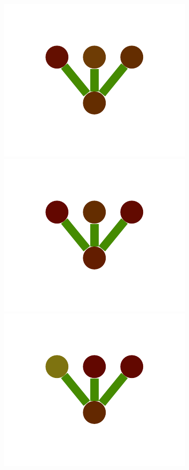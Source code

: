 \documentclass[a4paper,10pt]{article}
\begin{document}
\begin{figure}
{    \includegraphics[scale=.2]{./figures/6-1-single-color-flower-data-3.pdf}
    \includegraphics[scale=.2]{./figures/6-1-single-color-flower-data-4.pdf}
    \includegraphics[scale=.2]{./figures/6-1-single-color-flower-data-5.pdf}
}
\end{figure}
\end{document}
